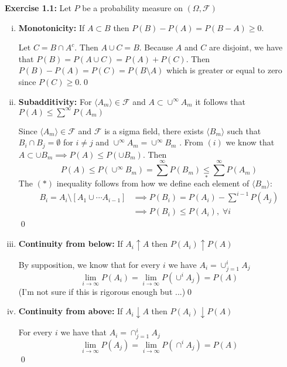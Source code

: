 \textbf{Exercise 1.1:} Let $P$ be a probability measure on $(\Omega, \mathcal{F})$
\begin{enumerate}[i)]
    \item \textbf{Monotonicity:} If $A \subset B$ then $P(B) - P(A) = P(B-A) \geq 0$.
    \begin{mdframed}
        Let $C = B \cap A^c$. Then $A \cup C = B$. Because $A$ and $C$ are disjoint, we have that $P(B) = P(A \cup C) = P(A) + P(C)$. Then $P(B) - P(A) = P(C) = P(B \setminus A)$ which is greater or equal to zero since $P(C) \geq 0$.\qed
    \end{mdframed}
    \item \textbf{Subadditivity:} For $\langle A_m \rangle \in \mathcal{F}$ and $A \subset \cup^\infty A_m$ it follows that $P(A) \leq \sum^\infty P(A_m)$
    \begin{mdframed}
        Since $\langle A_m \rangle \in \mathcal{F}$ and $\mathcal{F}$ is a sigma field, there exists $\langle B_m \rangle$ such that $B_i \cap B_j = \emptyset$ for $i \neq j$ and $\cup^\infty A_m = \cup^\infty B_m$ \cite[17--18]{royden2nd}. From $(i)$ we know that $A \subset \cup B_m \implies P(A) \leq P(\cup B_m)$. Then \[P(A) \leq P(\cup^\infty B_m) = \sum^\infty P(B_m) \underset{\ast}{\leq} \sum^\infty P(A_m)\] The $(\ast)$ inequality follows from how we define each element of $\langle B_m\rangle$:
        \begin{align*}
            B_i = A_i \setminus [A_1 \cup \cdots A_{i-1}] &\implies P(B_i) = P(A_i) - \sum^{i-1}P(A_j) \\
            &\implies P(B_i) \leq P(A_i), \; \forall i
        \end{align*}\qed
    \end{mdframed}

    \item \textbf{Continuity from below:} If $A_i \uparrow A$ then $P(A_i) \uparrow P(A)$
    \begin{mdframed}
        By supposition, we know that for every $i$ we have $A_i = \cup^i_{j = 1} A_j$ 
        \[\lim_{i \to \infty} P(A_i)= \lim_{i \to \infty} P(\cup^i A_j) = P(A)\]
        (I'm not sure if this is rigorous enough but ...)\qed
    \end{mdframed}
    \item \textbf{Continuity from above:} If $A_i \downarrow A$ then $P(A_i) \downarrow P(A)$
    \begin{mdframed}
        For every $i$ we have that $A_i = \cap_{j = 1}^i A_j$
        \[\lim_{i \to \infty} P(A_j)= \lim_{i \to \infty} P(\cap^i A_j ) = P(A)\] \qed
    \end{mdframed}
\end{enumerate} 
